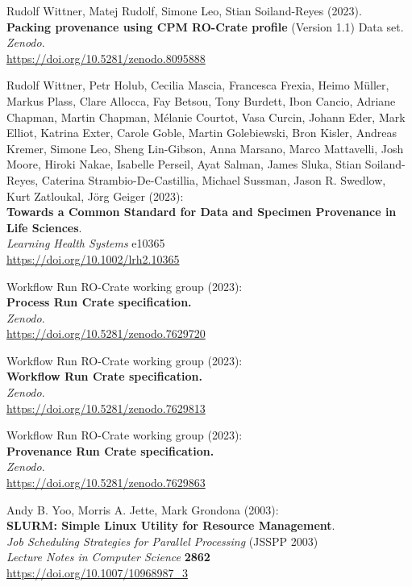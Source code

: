 \documentclass[10pt,letterpaper]{article}
\begin{document}
\begin{thebibliography}{10}
\begin{small}
 Rudolf Wittner, Matej Rudolf, Simone Leo, Stian Soiland-Reyes (2023).\\
\textbf{Packing provenance using CPM RO-Crate profile} (Version 1.1)
Data set.\\
\emph{Zenodo}.\\
\url{https://doi.org/10.5281/zenodo.8095888}

Rudolf Wittner, Petr Holub, Cecilia Mascia, Francesca Frexia, Heimo Müller, Markus Plass, Clare Allocca, Fay Betsou, Tony Burdett, Ibon Cancio, Adriane Chapman, Martin Chapman, Mélanie Courtot, Vasa Curcin, Johann Eder, Mark Elliot, Katrina Exter, Carole Goble, Martin Golebiewski, Bron Kisler, Andreas Kremer, Simone Leo, Sheng Lin-Gibson, Anna Marsano, Marco Mattavelli, Josh Moore, Hiroki Nakae, Isabelle Perseil, Ayat Salman, James Sluka, Stian Soiland-Reyes, Caterina Strambio-De-Castillia, Michael Sussman, Jason R. Swedlow, Kurt Zatloukal, Jörg Geiger (2023):\\
\textbf{Towards a Common Standard for Data and Specimen Provenance in
Life Sciences}.\\
\emph{Learning Health Systems} e10365\\
\url{https://doi.org/10.1002/lrh2.10365}


 Workflow Run RO-Crate working group (2023):\\
\textbf{Process Run Crate specification.}\\
\emph{Zenodo}.\\
\url{https://doi.org/10.5281/zenodo.7629720}

 Workflow Run RO-Crate working group (2023):\\
\textbf{Workflow Run Crate specification.}\\
\emph{Zenodo}.\\
\url{https://doi.org/10.5281/zenodo.7629813}

 Workflow Run RO-Crate working group (2023):\\
\textbf{Provenance Run Crate specification.}\\
\emph{Zenodo}.\\
\url{https://doi.org/10.5281/zenodo.7629863}

Andy B. Yoo, Morris A. Jette, Mark Grondona (2003):\\
\textbf{SLURM: Simple Linux Utility for Resource Management}.\\
\emph{Job Scheduling Strategies for Parallel Processing} (JSSPP 2003)\\
\emph{Lecture Notes in Computer Science} \textbf{2862}\\
\url{https://doi.org/10.1007/10968987_3}

\end{small}


\end{thebibliography}
\end{document}
